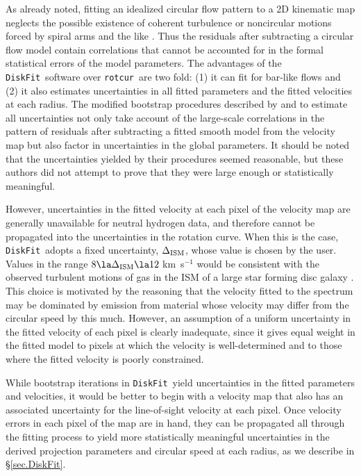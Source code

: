 \documentclass[letterpaper,fleqn,usenatbib]{mnras}
\def\DFt{{\tt DiskFit}}
\def\rtc{{\tt rotcur}}
\begin{document}
As already noted, fitting an idealized circular flow pattern to a 2D
kinematic map neglects the possible existence of coherent turbulence
or noncircular motions forced by spiral arms and the like
\citep{Oman19}.  Thus the residuals after subtracting a circular flow
model contain correlations that cannot be accounted for in the formal
statistical errors of the model parameters.  The advantages of the
\DFt\ software \citep{SS15} over \rtc\ are two fold: (1) it can fit
for bar-like flows and (2) it also estimates uncertainties in all
fitted parameters and the fitted velocities at each radius.  The
modified bootstrap procedures described by \citet{SS07} and
\citet{SZS10} to estimate all uncertainties not only take account of
the large-scale correlations in the pattern of residuals after
subtracting a fitted smooth model from the velocity map but also
factor in uncertainties in the global parameters.  It should be noted
that the uncertainties yielded by their procedures seemed reasonable,
but these authors did not attempt to prove that they were large enough
or statistically meaningful.

However, uncertainties in the fitted velocity at each pixel of the
velocity map are generally unavailable for neutral hydrogen data, and
therefore cannot be propagated into the uncertainties in the rotation
curve.  When this is the case, \DFt\ adopts a fixed uncertainty,
$\Delta_{\rm ISM}$, whose value is chosen by the user.  Values in the
range $8 \la \Delta_{\rm ISM} \la 12\;$km~s$^{-1}$ would be consistent
with the observed turbulent motions of gas in the ISM of a large star
forming disc galaxy \citep{GKT79, Ka93}.  This choice is motivated by
the reasoning that the velocity fitted to the spectrum may be
dominated by emission from material whose velocity may differ from the
circular speed by this much.  However, an assumption of a uniform
uncertainty in the fitted velocity of each pixel is clearly
inadequate, since it gives equal weight in the fitted model to pixels
at which the velocity is well-determined and to those where the fitted
velocity is poorly constrained.

While bootstrap iterations in \DFt\ yield uncertainties in the fitted
parameters and velocities, it would be better to begin with a velocity
map that also has an associated uncertainty for the line-of-sight
velocity at each pixel.  Once velocity errors in each pixel of the map
are in hand, they can be propagated all through the fitting process to
yield more statistically meaningful uncertainties in the derived
projection parameters and circular speed at each radius, as
we describe in \S\ref{sec.DiskFit}.
\end{document}
